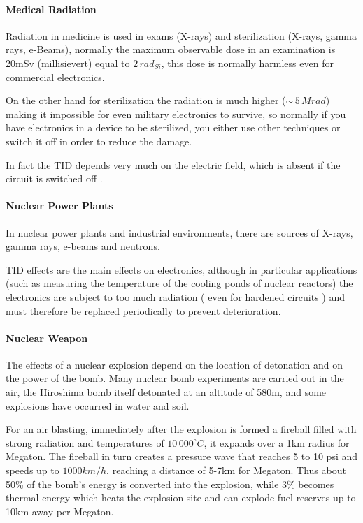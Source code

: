 {{{{{				}%

				\paragraph{Medical Radiation}{
					Radiation in medicine is used in exams (X-rays) and sterilization (X-rays, gamma rays, e-Beams), normally the maximum observable dose in an examination is 20mSv (millisievert) equal to $2\,rad_{Si}$, this dose is normally harmless even for commercial electronics.  
					
					On the other hand for sterilization the radiation is much higher ($\sim\,5\,Mrad$) making it impossible for even military electronics to survive, so normally if you have electronics in a device to be sterilized, you either use other techniques or switch it off in order to reduce the damage. 
					
					In fact the TID depends very much on the electric field, which is absent if the circuit is switched off .  
					
				}%
						
				\paragraph{Nuclear Power Plants}{
					In nuclear power plants and industrial environments, there are sources of X-rays, gamma rays, e-beams and neutrons.
					
					TID effects are the main effects on electronics, although in particular applications (such as measuring the temperature of the cooling ponds of nuclear reactors) the electronics are subject to too much radiation ( even for hardened circuits ) and must therefore be replaced periodically to prevent deterioration.
				} %
			
				\paragraph{Nuclear Weapon}{
					The effects of a nuclear explosion depend on the location of detonation and on the power of the bomb. Many nuclear bomb experiments are carried out in the air, the Hiroshima bomb itself detonated at an altitude of 580m, and some explosions have occurred in water and soil. 
					
					For an air blasting, immediately after the explosion is formed a fireball filled with strong radiation and temperatures of $10\,000^\circ C$, it expands over a 1km radius for Megaton. The fireball in turn creates a pressure wave that reaches 5 to 10 psi and speeds up to $1000 km/h$, reaching a distance of 5-7km for Megaton. Thus about 50\% of the bomb's energy is converted into the explosion, while 3\% becomes thermal energy which heats the explosion site and can explode fuel reserves up to 10km away per Megaton.\\
					
}}}}}
